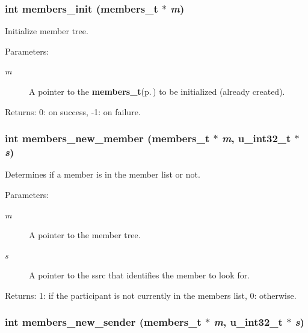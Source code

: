 \subsubsection{\setlength{\rightskip}{0pt plus 5cm}int members\_\-init ({\bf members\_\-t} $\ast$ {\em m})}\label{members_8c_a3}


Initialize member tree. \begin{Desc}
\item[Parameters:]
\begin{description}
\item[{\em m}]A pointer to the {\bf members\_\-t}{\rm (p.\,\pageref{structmembers__t})} to be initialized (already created). \end{description}
\end{Desc}
\begin{Desc}
\item[Returns:]0: on success, -1: on failure. \end{Desc}
\subsubsection{\setlength{\rightskip}{0pt plus 5cm}int members\_\-new\_\-member ({\bf members\_\-t} $\ast$ {\em m}, u\_\-int32\_\-t $\ast$ {\em s})}\label{members_8c_a9}


Determines if a member is in the member list or not. \begin{Desc}
\item[Parameters:]
\begin{description}
\item[{\em m}]A pointer to the member tree. \item[{\em s}]A pointer to the ssrc that identifies the member to look for. \end{description}
\end{Desc}
\begin{Desc}
\item[Returns:]1: if the participant is not currently in the members list, 0: otherwise. \end{Desc}
\subsubsection{\setlength{\rightskip}{0pt plus 5cm}int members\_\-new\_\-sender ({\bf members\_\-t} $\ast$ {\em m}, u\_\-int32\_\-t $\ast$ {\em s})}\label{members_8c_a10}


